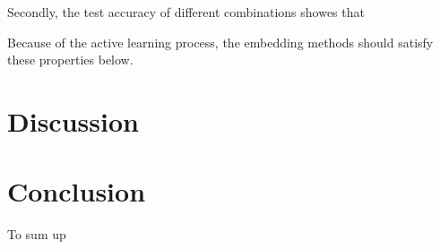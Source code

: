 \documentclass[letterpaper]{article}
\begin{document}
Secondly, the test accuracy of different combinations showes that 

Because of the active learning process, the embedding methods should satisfy these properties below.

\section{Discussion}

\section{Conclusion}
To sum up



\end{document}
